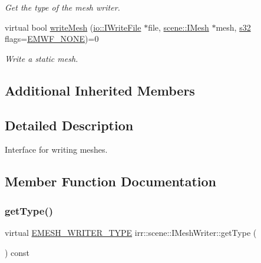\begin{DoxyCompactItemize}
\begin{DoxyCompactList}\small\item\em Get the type of the mesh writer. \end{DoxyCompactList}\item 
virtual bool \hyperlink{classirr_1_1scene_1_1IMeshWriter_a8cc31e211dc94104c7dd4b0ce4fd2cca}{write\+Mesh} (\hyperlink{classirr_1_1io_1_1IWriteFile}{io\+::\+I\+Write\+File} $\ast$file, \hyperlink{classirr_1_1scene_1_1IMesh}{scene\+::\+I\+Mesh} $\ast$mesh, \hyperlink{namespaceirr_ac66849b7a6ed16e30ebede579f9b47c6}{s32} flags=\hyperlink{namespaceirr_1_1scene_a9faae6cd9e415a0553cb4cdc190bbc1dac17214e9fb1a903dbe17812feff84656}{E\+M\+W\+F\+\_\+\+N\+O\+NE})=0
\begin{DoxyCompactList}\small\item\em Write a static mesh. \end{DoxyCompactList}\end{DoxyCompactItemize}
\subsection*{Additional Inherited Members}


\subsection{Detailed Description}
Interface for writing meshes. 

\subsection{Member Function Documentation}
\mbox{\label{classirr_1_1scene_1_1IMeshWriter_af70d702a86e25074f96e93a2d5a15813}} 
\subsubsection{\texorpdfstring{get\+Type()}{getType()}\hspace{0.1cm}{\footnotesize\ttfamily [1/2]}}
{\footnotesize\ttfamily virtual \hyperlink{namespaceirr_1_1scene_a431fa15741518ba15f6d5f2608b6cb4e}{E\+M\+E\+S\+H\+\_\+\+W\+R\+I\+T\+E\+R\+\_\+\+T\+Y\+PE} irr\+::scene\+::\+I\+Mesh\+Writer\+::get\+Type (\begin{DoxyParamCaption}{ }\end{DoxyParamCaption}) const\hspace{0.3cm}{\ttfamily [pure virtual]}}



